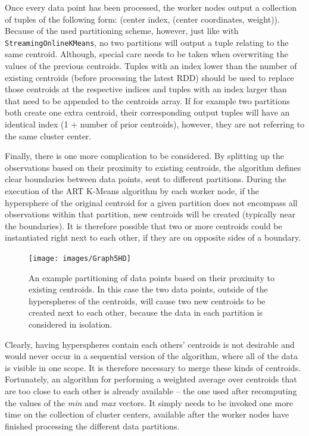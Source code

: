 \documentclass{l4proj}
\begin{document}
Once every data point has been processed, the worker nodes output a collection of tuples of the following form: (center index, (center coordinates, weight)). Because of the used partitioning scheme, however, just like with \texttt{StreamingOnlineKMeans}, no two partitions will output a tuple relating to the same centroid. Although, special care needs to be taken when overwriting the values of the previous centroids. Tuples with an index lower than the number of existing centroids (before processing the latest RDD) should be used to replace those centroids at the respective indices and tuples with an index larger than that need to be appended to the centroids array. If for example two partitions both create one extra centroid, their corresponding output tuples will have an identical index (1 + number of prior centroids), however, they are not referring to the same cluster center.

Finally, there is one more complication to be considered. By splitting up the observations based on their proximity to existing centroids, the algorithm defines clear boundaries between data points, sent to different partitions. During the execution of the ART K-Means algorithm by each worker node, if the hypersphere of the original centroid for a given partition does not encompass all observations within that partition, new centroids will be created (typically near the boundaries). It is therefore possible that two or more centroids could be instantiated right next to each other, if they are on opposite sides of a boundary.

\begin{figure}[H]
	\centering
    \label{grapgh-boundary}
    \texttt{[image: images/Graph5HD]}
    \caption{An example partitioning of data points based on their proximity to existing centroids. In this case the two data points, outside of the hyperspheres of the centroids, will cause two new centroids to be created next to each other, because the data in each partition is considered in isolation.} 
\end{figure}

Clearly, having hyperspheres contain each others' centroids is not desirable and would never occur in a sequential version of the algorithm, where all of the data is visible in one scope. It is therefore necessary to merge these kinds of centroids. Fortunately, an algorithm for performing a weighted average over centroids that are too  close to each other is already available -- the one used after recomputing the values of the \textit{min} and \textit{max} vectors. It simply needs to be invoked one more time on the collection of cluster centers, available after the worker nodes have finished processing the different data partitions. 
\end{document}
